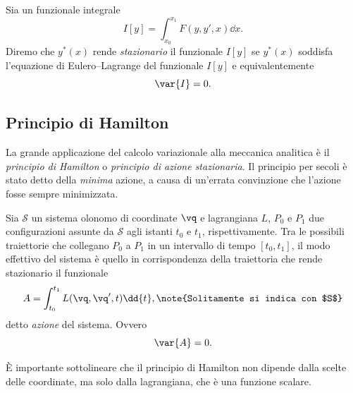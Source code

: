 \begin{definition}
    Sia un funzionale integrale
    \begin{equation*}
        I[y] = \int_{x_0}^{x_1} F(y, y', x)\dd{x}.
    \end{equation*}
    Diremo che $y^*(x)$ rende \emph{stazionario} il funzionale $I[y]$ se $y^*(x)$ soddisfa l'equazione di Eulero--Lagrange del funzionale $I[y]$ e equivalentemente
    \begin{equation*}
        \var{I} = 0.
    \end{equation*}
\end{definition}

\subsection{Principio di Hamilton}
La grande applicazione del calcolo variazionale alla meccanica analitica è il \emph{principio di Hamilton} o \emph{principio di azione stazionaria}. Il principio per secoli è stato detto della \emph{minima} azione, a causa di un'errata convinzione che l'azione fosse sempre minimizzata.

\begin{theorem}
    Sia $\mathcal{S}$ un sistema olonomo di coordinate $\vq$ e lagrangiana $L$, $P_0$ e $P_1$ due configurazioni assunte da $\mathcal{S}$ agli istanti $t_0$ e $t_1$, rispettivamente. Tra le possibili traiettorie che collegano $P_0$ a $P_1$ in un intervallo di tempo $[t_0, t_1]$, il modo effettivo del sistema è quello in corrispondenza della traiettoria che rende stazionario il funzionale
    \begin{equation*}
        A = \int_{t_0}^{t_1} L(\vq, \vq', t) \dd{t},\note{Solitamente si indica con $S$}
    \end{equation*}
    detto \emph{azione} del sistema. Ovvero
    \begin{equation*}
        \var{A} = 0.
    \end{equation*}
\end{theorem}
È importante sottolineare che il principio di Hamilton non dipende dalla scelte delle coordinate, ma solo dalla lagrangiana, che è una funzione scalare.